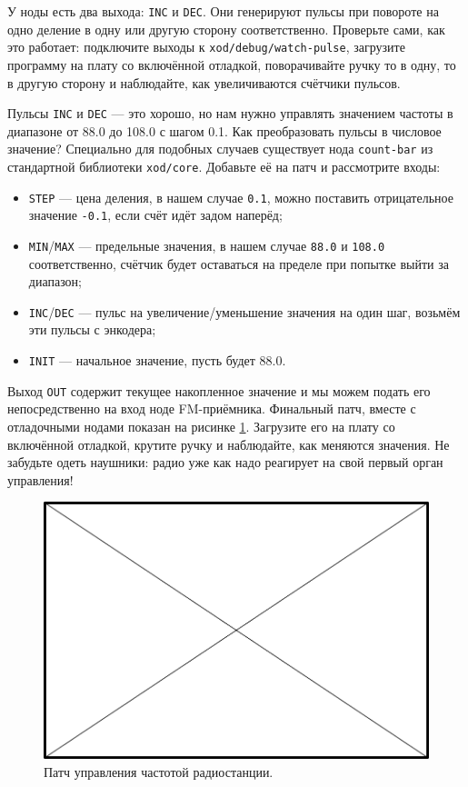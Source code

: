 У ноды есть два выхода: \texttt{INC} и \texttt{DEC}. Они генерируют пульсы при повороте на одно деление в одну или другую сторону соответственно. Проверьте сами, как это работает: подключите выходы к \texttt{xod/debug/watch-pulse}, загрузите программу на плату со включённой отладкой, поворачивайте ручку то в одну, то в другую сторону и наблюдайте, как увеличиваются счётчики пульсов.

Пульсы \texttt{INC} и \texttt{DEC} — это хорошо, но нам нужно управлять значением частоты в диапазоне от 88.0 до 108.0 с шагом 0.1. Как преобразовать пульсы в числовое значение? Специально для подобных случаев существует нода \texttt{count-bar} из стандартной библиотеки \texttt{xod/core}. Добавьте её на патч и рассмотрите входы:

\begin{itemize}
  \item \texttt{STEP} — цена деления, в нашем случае \texttt{0.1}, можно поставить отрицательное значение \texttt{-0.1}, если счёт идёт задом наперёд;
  \item \texttt{MIN}/\texttt{MAX} — предельные значения, в нашем случае \texttt{88.0} и \texttt{108.0} соответственно, счётчик будет оставаться на пределе при попытке выйти за диапазон;
  \item \texttt{INC}/\texttt{DEC} — пульс на увеличение/уменьшение значения на один шаг, возьмём эти пульсы с энкодера;
  \item \texttt{INIT} — начальное значение, пусть будет {88.0}.
\end{itemize}

Выход \texttt{OUT} содержит текущее накопленное значение и мы можем подать его непосредственно на вход ноде FM-приёмника. Финальный патч, вместе с отладочными нодами показан на рисинке \ref{patch:enc-count-freq}. Загрузите его на плату со включённой отладкой, крутите ручку и наблюдайте, как меняются значения. Не забудьте одеть наушники: радио уже как надо реагирует на свой первый орган управления!

\begin{figure}
  \centering
  \includegraphics{TODO.png}
  \caption{Патч управления частотой радиостанции.}
  \label{patch:enc-count-freq}
\end{figure}

